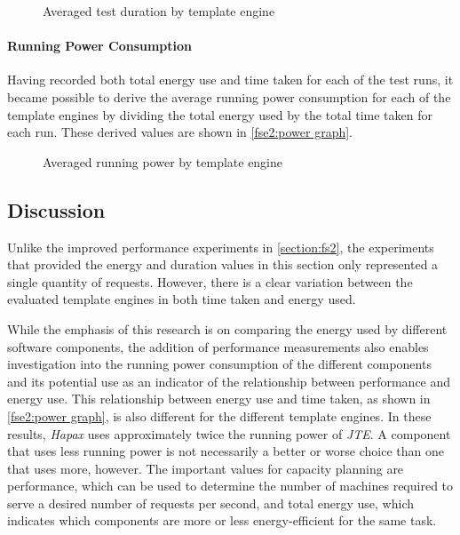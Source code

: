 \begin{figure}[htbp]
  \centering
  
  \caption{Averaged test duration by template engine}
  \label{fse2:time graph}
\end{figure}

\paragraph{Running Power Consumption}
\label{fse2 results power}

Having recorded both total energy use and time taken for each of the test runs, it became possible to derive the average running power consumption for each of the \gls{template engine}s by dividing the total energy used by the total time taken for each run. These derived values are shown in \autoref{fse2:power graph}.

\begin{figure}[htbp]
  \centering
  
  \caption{Averaged running power by template engine}
  \label{fse2:power graph}
\end{figure}

\subsection{Discussion}
\label{fse2 discussion}

Unlike the improved performance experiments in \autoref{section:fs2}, the experiments that provided the energy and duration values in this section only represented a single quantity of requests. However, there is a clear variation between the evaluated \gls{template engine}s in both time taken and energy used. 

While the emphasis of this research is on comparing the energy used by different software components, the addition of performance measurements also enables investigation into the running power consumption of the different components and its potential use as an indicator of the relationship between performance and energy use. This relationship between energy use and time taken, as shown in \autoref{fse2:power graph}, is also different for the different \gls{template engine}s. In these results, \emph{Hapax} uses approximately twice the running power of \emph{JTE}. A component that uses less running power is not necessarily a better or worse choice than one that uses more, however. The important values for capacity planning are performance, which can be used to determine the number of machines required to serve a desired number of requests per second, and total energy use, which indicates which components are more or less energy-efficient for the same task.

